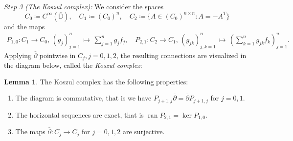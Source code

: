 \documentclass[letterpaper, 11pt]{article}
\newcommand{\D}{\mathbb{D}}
\newcommand{\1}{\mathds{1}}
\DeclareMathOperator*{\ran}{ran}
\theoremstyle{definition}
\newtheorem{lemma}[theorem]{Lemma}
\newenvironment{innerproof}
 {\renewcommand{\qedsymbol}{}\proof}
 {\endproof}
\begin{document}
\begin{innerproof}
  \textit{Step 3 (The Koszul complex):} We consider the spaces
  \begin{equation*}
    C_0 \coloneqq C^\infty(\overline{\D}), \quad C_1 \coloneqq (C_0)^n, \quad C_2 \coloneqq \{ A \in (C_0)^{n \times n} : A = -A^T \}
  \end{equation*}
  and the maps
  \begin{align*}
    P_{1,0} : C_1 \to C_0,\, (g_j)_{j=1}^n \,\mapsto\, \sum_{j=1}^n g_j f_j, \quad P_{2,1} : C_2 \to C_1,\, (g_{jk})_{j,k=1}^n \,\mapsto\, \left( \sum_{k=1}^n g_{jk} f_k \right)_{j=1}^n.
  \end{align*}
  Applying $\overline{\partial}$ pointwise in $C_j, j = 0, 1, 2$, the resulting connections are visualized in the diagram below, called the \emph{Koszul complex}:
  \begin{center}
  \end{center}
\end{innerproof}

\begin{lemma}
  The Koszul complex has the following properties:
  \begin{enumerate}
    \item The diagram is commutative, that is we have $P_{j+1,j} \overline{\partial} = \overline{\partial} P_{j+1,j}$ for $j = 0,1$.
    \item The horizontal sequences are exact, that is $\ran P_{2,1} = \ker P_{1,0}$.
    \item The maps $\overline{\partial} : C_j \to C_j$ for $j=0,1,2$ are surjective.
  \end{enumerate}
\end{lemma}
\end{document}
